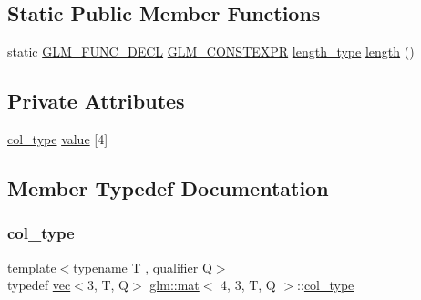 \subsection*{Static Public Member Functions}
\begin{DoxyCompactItemize}
\item 
static \hyperlink{setup_8hpp_ab2d052de21a70539923e9bcbf6e83a51}{G\+L\+M\+\_\+\+F\+U\+N\+C\+\_\+\+D\+E\+CL} \hyperlink{setup_8hpp_a08b807947b47031d3a511f03f89645ad}{G\+L\+M\+\_\+\+C\+O\+N\+S\+T\+E\+X\+PR} \hyperlink{structglm_1_1mat_3_014_00_013_00_01_t_00_01_q_01_4_a24f0f2085bebe0a6e79da267368e74f5}{length\+\_\+type} \hyperlink{structglm_1_1mat_3_014_00_013_00_01_t_00_01_q_01_4_a3f28efbb3e6be20443f461a6261ae631}{length} ()
\end{DoxyCompactItemize}
\subsection*{Private Attributes}
\begin{DoxyCompactItemize}
\item 
\hyperlink{structglm_1_1mat_3_014_00_013_00_01_t_00_01_q_01_4_ab7cb76d6290691108c8af724270e3b6c}{col\+\_\+type} \hyperlink{structglm_1_1mat_3_014_00_013_00_01_t_00_01_q_01_4_ad14b8b7424e4b4cadee7d85cedc61b7a}{value} \mbox{[}4\mbox{]}
\end{DoxyCompactItemize}


\subsection{Member Typedef Documentation}
\mbox{\label{structglm_1_1mat_3_014_00_013_00_01_t_00_01_q_01_4_ab7cb76d6290691108c8af724270e3b6c}} 
\subsubsection{\texorpdfstring{col\+\_\+type}{col\_type}}
{\footnotesize\ttfamily template$<$typename T , qualifier Q$>$ \\
typedef \hyperlink{structglm_1_1vec}{vec}$<$3, T, Q$>$ \hyperlink{structglm_1_1mat}{glm\+::mat}$<$ 4, 3, T, Q $>$\+::\hyperlink{structglm_1_1mat_3_014_00_013_00_01_t_00_01_q_01_4_ab7cb76d6290691108c8af724270e3b6c}{col\+\_\+type}}

